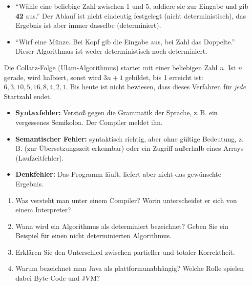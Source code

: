 \begin{itemize}[itemsep=0.1em]
\item \enquote{Wähle eine beliebige Zahl zwischen 1 und 5, addiere sie zur Eingabe und gib \textbf{42} aus.} Der Ablauf ist nicht eindeutig festgelegt (nicht deterministisch), das Ergebnis ist aber immer dasselbe (determiniert).
\item \enquote{Wirf eine Münze. Bei Kopf gib die Eingabe aus, bei Zahl das Doppelte.} Dieser Algorithmus ist weder deterministisch noch determiniert.
\end{itemize}

Die Collatz-Folge (Ulam-Algorithmus) startet mit einer beliebigen Zahl $n$. Ist $n$ gerade, wird halbiert, sonst wird $3n + 1$ gebildet, bis 1 erreicht ist: $6, 3, 10, 5, 16, 8, 4, 2, 1$. Bis heute ist nicht bewiesen, dass dieses Verfahren für \emph{jede} Startzahl endet.

\begin{itemize}[itemsep=0.1em]
\item \textbf{Syntaxfehler:} Verstoß gegen die Grammatik der Sprache, z.\,B. ein vergessenes Semikolon. Der Compiler meldet ihn.
\item \textbf{Semantischer Fehler:} syntaktisch richtig, aber ohne gültige Bedeutung, z.\,B.  (zur Übersetzungszeit erkennbar) oder ein Zugriff außerhalb eines Arrays (Laufzeitfehler).
\item \textbf{Denkfehler:} Das Programm läuft, liefert aber nicht das gewünschte Ergebnis.
\end{itemize}

\aufgaben
{}
\begin{enumerate}[label=\alph*)]
\item Was versteht man unter einem Compiler? Worin unterscheidet er sich von einem Interpreter?
\item Wann wird ein Algorithmus als determiniert bezeichnet? Geben Sie ein Beispiel für einen nicht determinierten Algorithmus.
\item Erklären Sie den Unterschied zwischen partieller und totaler Korrektheit.
\item Warum bezeichnet man Java als plattformunabhängig? Welche Rolle spielen dabei Byte-Code und JVM?
\end{enumerate}

